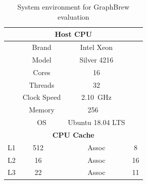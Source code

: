 \documentclass[sigconf, nonacm]{acmart}
\begin{document}
\begin{scriptsize}
	\begin{table}[t]
		\centering
		\caption{System environment for GraphBrew evaluation}
			\begin{tabular}{@{}lccc@{}}
				\toprule \toprule
				\multicolumn{4}{c}{\textbf{Host CPU}} \\
				\midrule
				& Brand                                 & Intel Xeon                                    \\
				& Model                                 & Silver 4216                                   \\
				& Cores                                 & 16                                            \\
				& Threads                               & 32                                            \\
				& Clock Speed                           & \SI{2.10}{\giga\hertz}                        \\
				& Memory                                & \SI{256}{\giga\byte}                          \\
				& OS                                    & Ubuntu 18.04 LTS                              \\
				\multicolumn{4}{c}{\textbf{CPU Cache}} \\
				\midrule
				L1                               & \SI{512}{\kilo\byte} & Assoc &  8  \\
				L2                               & \SI{16}{\mega\byte}  & Assoc &  16 \\
				L3                               & \SI{22}{\mega\byte}  & Assoc &  11 \\
				\bottomrule \bottomrule
			\end{tabular}
		\label{table:system}
	\end{table}
\end{scriptsize}
\end{document}
